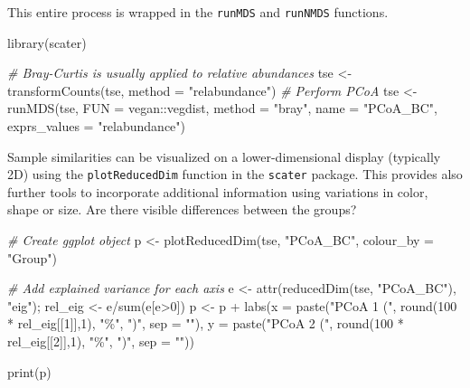 \documentclass[
]{book}
\newenvironment{Shaded}{\begin{snugshade}}{\end{snugshade}}
\newcommand{\AttributeTok}[1]{\textcolor[rgb]{0.77,0.63,0.00}{#1}}
\newcommand{\CommentTok}[1]{\textcolor[rgb]{0.56,0.35,0.01}{\textit{#1}}}
\newcommand{\DecValTok}[1]{\textcolor[rgb]{0.00,0.00,0.81}{#1}}
\newcommand{\FunctionTok}[1]{\textcolor[rgb]{0.00,0.00,0.00}{#1}}
\newcommand{\NormalTok}[1]{#1}
\newcommand{\OtherTok}[1]{\textcolor[rgb]{0.56,0.35,0.01}{#1}}
\newcommand{\SpecialCharTok}[1]{\textcolor[rgb]{0.00,0.00,0.00}{#1}}
\newcommand{\StringTok}[1]{\textcolor[rgb]{0.31,0.60,0.02}{#1}}
\begin{document}
This entire process is wrapped in the \texttt{runMDS} and \texttt{runNMDS}
functions.

\begin{Shaded}
\begin{Highlighting}[]
\FunctionTok{library}\NormalTok{(scater)}

\CommentTok{\# Bray{-}Curtis is usually applied to relative abundances}
\NormalTok{tse }\OtherTok{\textless{}{-}} \FunctionTok{transformCounts}\NormalTok{(tse, }\AttributeTok{method =} \StringTok{"relabundance"}\NormalTok{)}
\CommentTok{\# Perform PCoA}
\NormalTok{tse }\OtherTok{\textless{}{-}} \FunctionTok{runMDS}\NormalTok{(tse, }\AttributeTok{FUN =}\NormalTok{ vegan}\SpecialCharTok{::}\NormalTok{vegdist, }\AttributeTok{method =} \StringTok{"bray"}\NormalTok{, }\AttributeTok{name =} \StringTok{"PCoA\_BC"}\NormalTok{, }\AttributeTok{exprs\_values =} \StringTok{"relabundance"}\NormalTok{)}
\end{Highlighting}
\end{Shaded}

Sample similarities can be visualized on a lower-dimensional display
(typically 2D) using the \texttt{plotReducedDim} function in the \texttt{scater}
package. This provides also further tools to incorporate additional
information using variations in color, shape or size. Are there
visible differences between the groups?

\begin{Shaded}
\begin{Highlighting}[]
\CommentTok{\# Create ggplot object}
\NormalTok{p }\OtherTok{\textless{}{-}} \FunctionTok{plotReducedDim}\NormalTok{(tse, }\StringTok{"PCoA\_BC"}\NormalTok{, }\AttributeTok{colour\_by =} \StringTok{"Group"}\NormalTok{)}

\CommentTok{\# Add explained variance for each axis}
\NormalTok{e }\OtherTok{\textless{}{-}} \FunctionTok{attr}\NormalTok{(}\FunctionTok{reducedDim}\NormalTok{(tse, }\StringTok{"PCoA\_BC"}\NormalTok{), }\StringTok{"eig"}\NormalTok{);}
\NormalTok{rel\_eig }\OtherTok{\textless{}{-}}\NormalTok{ e}\SpecialCharTok{/}\FunctionTok{sum}\NormalTok{(e[e}\SpecialCharTok{\textgreater{}}\DecValTok{0}\NormalTok{])          }
\NormalTok{p }\OtherTok{\textless{}{-}}\NormalTok{ p }\SpecialCharTok{+} \FunctionTok{labs}\NormalTok{(}\AttributeTok{x =} \FunctionTok{paste}\NormalTok{(}\StringTok{"PCoA 1 ("}\NormalTok{, }\FunctionTok{round}\NormalTok{(}\DecValTok{100} \SpecialCharTok{*}\NormalTok{ rel\_eig[[}\DecValTok{1}\NormalTok{]],}\DecValTok{1}\NormalTok{), }\StringTok{"\%"}\NormalTok{, }\StringTok{")"}\NormalTok{, }\AttributeTok{sep =} \StringTok{""}\NormalTok{),}
              \AttributeTok{y =} \FunctionTok{paste}\NormalTok{(}\StringTok{"PCoA 2 ("}\NormalTok{, }\FunctionTok{round}\NormalTok{(}\DecValTok{100} \SpecialCharTok{*}\NormalTok{ rel\_eig[[}\DecValTok{2}\NormalTok{]],}\DecValTok{1}\NormalTok{), }\StringTok{"\%"}\NormalTok{, }\StringTok{")"}\NormalTok{, }\AttributeTok{sep =} \StringTok{""}\NormalTok{))}

\FunctionTok{print}\NormalTok{(p)}
\end{Highlighting}
\end{Shaded}
\end{document}
